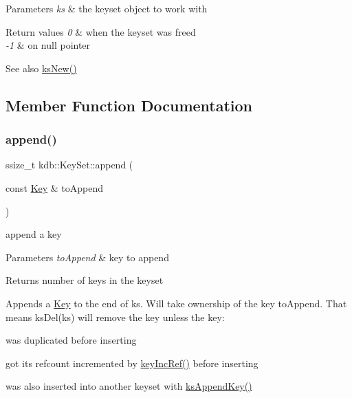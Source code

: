 \begin{DoxyParams}{Parameters}
{\em ks} & the keyset object to work with \\
\hline
\end{DoxyParams}

\begin{DoxyRetVals}{Return values}
{\em 0} & when the keyset was freed \\
\hline
{\em -\/1} & on null pointer \\
\hline
\end{DoxyRetVals}
\begin{DoxySeeAlso}{See also}
\hyperlink{group__keyset_ga671e1aaee3ae9dc13b4834a4ddbd2c3c}{ks\+New()} 
\end{DoxySeeAlso}


\subsection{Member Function Documentation}
\mbox{\label{classkdb_1_1KeySet_a0d4b2f3aa9f58d10053561135b50233e}} 
\subsubsection{\texorpdfstring{append()}{append()}\hspace{0.1cm}{\footnotesize\ttfamily [1/2]}}
{\footnotesize\ttfamily ssize\+\_\+t kdb\+::\+Key\+Set\+::append (\begin{DoxyParamCaption}\item[{const \hyperlink{classkdb_1_1Key}{Key} \&}]{to\+Append }\end{DoxyParamCaption})\hspace{0.3cm}{\ttfamily [inline]}}



append a key 


\begin{DoxyParams}{Parameters}
{\em to\+Append} & key to append\\
\hline
\end{DoxyParams}
\begin{DoxyReturn}{Returns}
number of keys in the keyset
\end{DoxyReturn}
Appends a \hyperlink{classkdb_1_1Key}{Key} to the end of {\ttfamily ks}. Will take ownership of the key {\ttfamily to\+Append}. That means ks\+Del(ks) will remove the key unless the key\+:
\begin{DoxyItemize}
\item was duplicated before inserting
\item got its refcount incremented by \hyperlink{group__key_ga6970a6f254d67af7e39f8e469bb162f1}{key\+Inc\+Ref()} before inserting
\item was also inserted into another keyset with \hyperlink{group__keyset_gaa5a1d467a4d71041edce68ea7748ce45}{ks\+Append\+Key()}
\end{DoxyItemize}

